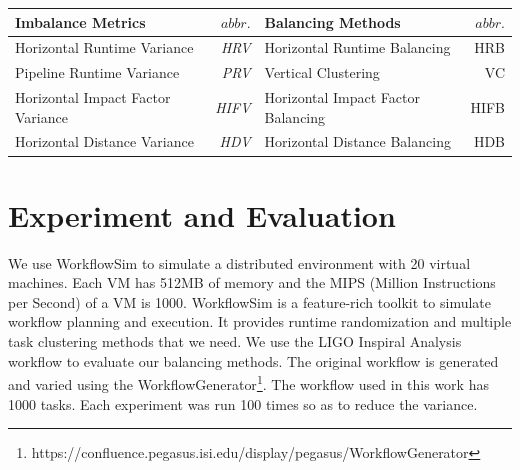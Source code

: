 \begin{table}

\begin{tabular}{l|r|l|r}
\hline
Imbalance Metrics & $abbr.$ & Balancing Methods & $abbr.$  \\
\hline
Horizontal Runtime Variance & {\em HRV} & Horizontal Runtime Balancing & HRB   \\ \hline
Pipeline Runtime Variance &{\em PRV}  & Vertical Clustering & VC \\ \hline
Horizontal Impact Factor Variance &{\em HIFV} & Horizontal Impact Factor Balancing & HIFB\\ \hline
 Horizontal Distance Variance & {\em HDV} &Horizontal Distance Balancing & HDB \\ 
\hline
\end{tabular}
\label{tab:2}
\end{table}

\section{Experiment and Evaluation}

We use WorkflowSim \cite{WorkflowSim} to simulate a distributed environment with 20 virtual machines. Each VM has 512MB of memory and the MIPS (Million Instructions per Second) of a VM is 1000. WorkflowSim is a feature-rich toolkit to simulate workflow planning and execution. It provides runtime randomization and multiple task clustering methods that we need. We use the LIGO \cite{Abramovici1992} Inspiral Analysis workflow to evaluate our balancing methods. 
The original workflow is generated and varied using the WorkflowGenerator\footnote[1]{https://confluence.pegasus.isi.edu/display/pegasus/WorkflowGenerator}. The workflow used in this work has 1000 tasks. Each experiment was run 100 times so as to reduce the variance.


